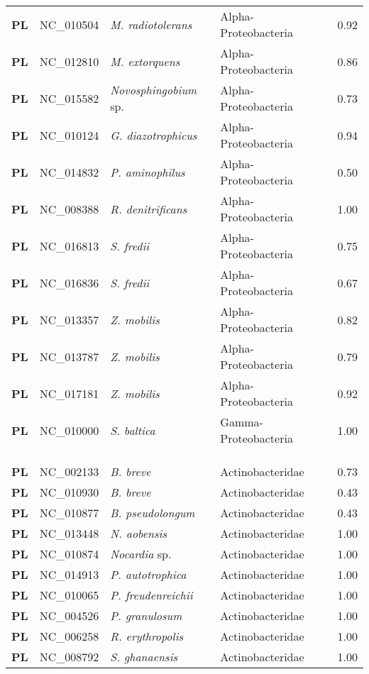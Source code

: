 \begin{adjustwidth}{-3cm}{2cm}
{\begin{supertabular}{>{\bfseries}l|p{0.1\textwidth}p{0.14\textwidth}l|l}
PL & NC\_010504 &  \textit{M. radiotolerans} & Alpha-Proteobacteria & 0.92\\
PL & NC\_012810 &  \textit{M. extorquens} & Alpha-Proteobacteria & 0.86\\
PL & NC\_015582 &  \textit{Novosphingobium} sp. & Alpha-Proteobacteria & 0.73\\
PL & NC\_010124 &  \textit{G. diazotrophicus} & Alpha-Proteobacteria & 0.94\\
PL & NC\_014832 &  \textit{P. aminophilus} & Alpha-Proteobacteria & 0.50\\
PL & NC\_008388 &  \textit{R. denitrificans} & Alpha-Proteobacteria & 1.00\\
PL & NC\_016813 &  \textit{S. fredii} & Alpha-Proteobacteria & 0.75\\
PL & NC\_016836 &  \textit{S. fredii} & Alpha-Proteobacteria & 0.67\\
PL & NC\_013357 &  \textit{Z. mobilis} & Alpha-Proteobacteria & 0.82\\
PL & NC\_013787 &  \textit{Z. mobilis} & Alpha-Proteobacteria & 0.79\\
PL & NC\_017181 &  \textit{Z. mobilis} & Alpha-Proteobacteria & 0.92\\
PL & NC\_010000 &  \textit{S. baltica} & Gamma-Proteobacteria & 1.00\\
\\
\\
\hline\\
PL & NC\_002133 & \textit{B. breve} & Actinobacteridae & 0.73\\
PL & NC\_010930 & \textit{B. breve} & Actinobacteridae & 0.43\\
PL & NC\_010877 & \textit{B. pseudolongum} & Actinobacteridae & 0.43\\
PL & NC\_013448 & \textit{N. aobensis} & Actinobacteridae & 1.00\\
PL & NC\_010874 & \textit{Nocardia} sp. & Actinobacteridae & 1.00\\
PL & NC\_014913 & \textit{P. autotrophica} & Actinobacteridae & 1.00\\
PL & NC\_010065 & \textit{P. freudenreichii} & Actinobacteridae & 1.00\\
PL & NC\_004526 & \textit{P. granulosum} & Actinobacteridae & 1.00\\
PL & NC\_006258 & \textit{R. erythropolis} & Actinobacteridae & 1.00\\
PL & NC\_008792 & \textit{S. ghanaensis} & Actinobacteridae & 1.00\\

\end{supertabular}}
\end{adjustwidth}

